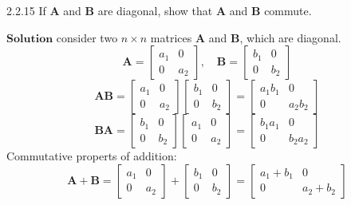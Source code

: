 \documentclass{article}
\begin{document}
\begin{flushleft}
\newpage

\begin{mybox}{2.2.15}
If $\mathbf{A}$ and $\mathbf{B}$ are diagonal, show that $\mathbf{A}$ and $\mathbf{B}$ commute.
\end{mybox}

$\boxed{\textbf{Solution}}$  consider two $n\times n$ matrices $\mathbf{A}$ and $\mathbf{B}$, which are diagonal.
$$\mathbf{A}=\left[\begin{array}{ll}{a_{1}} & {0} \\ {0} & {a_{2}}\end{array}\right], \quad \mathbf{B}=\left[\begin{array}{ll}{b_{1}} & {0} \\ {0} & {b_{2}}\end{array}\right]$$
$$\mathbf{A} \mathbf{B}=\left[\begin{array}{ll}{a_{1}} & {0} \\ {0} & {a_{2}}\end{array}\right]\left[\begin{array}{ll}{b_{1}} & {0} \\ {0} & {b_{2}}\end{array}\right]=\left[\begin{array}{cc}{a_{1} b_{1}} & {0} \\ {0} & {a_{2} b_{2}}\end{array}\right]$$
$$\mathbf{B} \mathbf{A}=\left[\begin{array}{ll}{b_{1}} & {0} \\ {0} & {b_{2}}\end{array}\right]\left[\begin{array}{ll}{a_{1}} & {0} \\ {0} & {a_{2}}\end{array}\right]=\left[\begin{array}{lll}{b_{1} a_{1}} & {0} \\ {0} & {b_{2} a_{2}}\end{array}\right]$$
Commutative properts of addition:
$$\mathbf{A}+\mathbf{B}=\left[\begin{array}{ll}{a_{1}} & {0} \\ {0} & {a_{2}}\end{array}\right]+\left[\begin{array}{ll}{b_{1}} & {0} \\ {0} & {b_{2}}\end{array}\right]=\left[\begin{array}{ccc}{a_{1}+b_{1}} & {0} \\ {0} & {a_{2}+b_{2}}\end{array}\right]$$

\end{flushleft}
\end{document}
